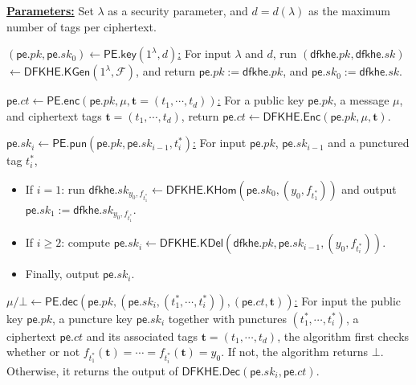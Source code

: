 \documentclass[runningheads,10pt]{llncs}
\begin{document}
\begin{description}
\item \underline{\textbf{Parameters:}} Set $\lambda$ as a security parameter, and  $d=d(\lambda)$  as the maximum number of tags per ciphertext.
	\item \underline{$(\mathsf{pe}.pk, \mathsf{pe}.sk_0) \leftarrow \mathsf{PE.key}(1^\lambda, d)$:}  For input  $\lambda$ and
	 $d$,   
	run $(\mathsf{dfkhe}.pk, \mathsf{dfkhe}.sk) $ $\leftarrow \mathsf{DFKHE.KGen}(1^\lambda, \mathcal{F})$, and 
	return  $\mathsf{pe}.pk:=\mathsf{dfkhe}.pk$, and $ \mathsf{pe}.sk_0:=\mathsf{dfkhe}.sk$.
	\item \underline{$\mathsf{pe}.ct \leftarrow \mathsf{PE.enc}(\mathsf{pe}.pk,\mu, \mathbf{t}=(t_1, \cdots, t_d))$:} For a public key $\mathsf{pe}.pk$, a message $\mu$, and ciphertext tags $\mathbf{t}=(t_1, \cdots, t_d)$,  return $\mathsf{pe}.ct \leftarrow \mathsf{DFKHE.Enc}(\mathsf{pe}.pk, \mu, \mathbf{t} )$.
	
	
	\item \underline{$\mathsf{pe}.sk_{i} \leftarrow \mathsf{PE.pun}(\mathsf{pe}.pk, \mathsf{pe}.sk_{i-1}, t^*_{i})$:} 
	For input $\mathsf{pe}.pk$, $\mathsf{pe}.sk_{i-1}$ and a punctured tag $t^*_i$,
	
	\begin{itemize}
	\item  If $i=1$: run  $\mathsf{dfkhe}.sk_{y_0,f_{t^*_1}} \leftarrow \mathsf{DFKHE.KHom}(\mathsf{pe}.sk_{0}, (y_0,f_{t^*_1}))$ and output $\mathsf{pe}.sk_{1}:=\mathsf{dfkhe}.sk_{y_0,f_{t^*_1}} $.
	\item If $i  \geq 2$: compute 
	$\mathsf{pe}.sk_{i} \leftarrow \mathsf{DFKHE.KDel}(\mathsf{dfkhe}.pk, \mathsf{pe}.sk_{i-1},(y_0,f_{t^*_{i}}) ).$
	\item Finally, output $\mathsf{pe}.sk_{i}.$
	\end{itemize}
	
	\item  \underline{$\mu/\bot \leftarrow \mathsf{PE.dec}(\mathsf{pe}.pk, (\mathsf{pe}.sk_{i}, (t^*_1, \cdots, t^*_i)),(\mathsf{pe}.ct, \mathbf{t}))$:}  
	For input the public key
	$\mathsf{pe}.pk$, a puncture key $\mathsf{pe}.sk_{i}$ together with punctures  $(t^*_1, \cdots, t^*_i)$, a ciphertext $\mathsf{pe}.ct$ and its associated tags $\mathbf{t}=(t_1, \cdots, t_d)$, the algorithm first checks whether or not $f_{t^*_1}(\mathbf{t})=\cdots=f_{t^*_i}(\mathbf{t})=y_0$. If not, the algorithm  returns $\bot$. Otherwise, it returns the output of $ \mathsf{DFKHE.Dec}(\mathsf{pe}.sk_{i}, \mathsf{pe}.ct)$. 
	
\end{description}
\end{document}
